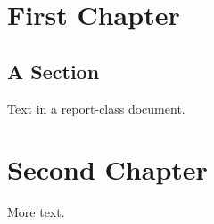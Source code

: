 \documentclass{report}
\begin{document}
\chapter{First Chapter}
\section{A Section}
Text in a report-class document.
\chapter{Second Chapter}
More text.
\end{document}
